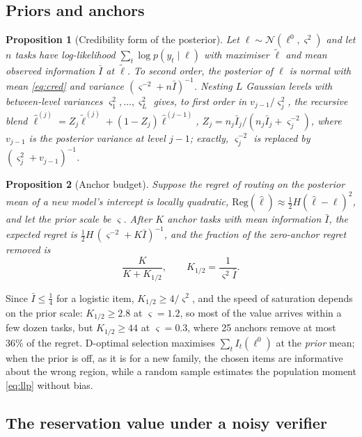 \documentclass[11pt,a4paper]{article}
\newtheorem{proposition}{Proposition}
\theoremstyle{definition}
\theoremstyle{remark}
\theoremstyle{definition}
\begin{document}
\subsection{Priors and anchors}

\begin{proposition}[Credibility form of the posterior]
\label{prop:cred}
Let $\ell\sim\mathcal N(\ell^0,\varsigma^2)$ and let $n$ tasks have log-likelihood $\sum_t\log p(y_t\mid\ell)$ with maximiser $\tilde\ell$ and mean observed information $\bar I$ at $\tilde\ell$. To second order, the posterior of $\ell$ is normal with mean \eqref{eq:cred} and variance $(\varsigma^{-2}+n\bar I)^{-1}$. Nesting $L$ Gaussian levels with between-level variances $\varsigma_1^2,\dots,\varsigma_L^2$ gives, to first order in $v_{j-1}/\varsigma_j^2$, the recursive blend $\hat\ell^{(j)}=Z_j\tilde\ell^{(j)}+(1-Z_j)\hat\ell^{(j-1)}$, $Z_j=n_j\bar I_j/(n_j\bar I_j+\varsigma_j^{-2})$, where $v_{j-1}$ is the posterior variance at level $j-1$; exactly, $\varsigma_j^{-2}$ is replaced by $(\varsigma_j^2+v_{j-1})^{-1}$.
\end{proposition}

\begin{proposition}[Anchor budget]
\label{prop:anchor}
Suppose the regret of routing on the posterior mean of a new model's intercept is locally quadratic, $\mathrm{Reg}(\hat\ell)\approx\tfrac12 H(\hat\ell-\ell)^2$, and let the prior scale be $\varsigma$. After $K$ anchor tasks with mean information $\bar I$, the expected regret is $\tfrac12 H\,(\varsigma^{-2}+K\bar I)^{-1}$, and the fraction of the zero-anchor regret removed is
\[
\frac{K}{K+K_{1/2}},\qquad K_{1/2}=\frac{1}{\varsigma^2\bar I}.
\]
\end{proposition}
Since $\bar I\le\tfrac14$ for a logistic item, $K_{1/2}\ge4/\varsigma^2$, and the speed of saturation depends on the prior scale: $K_{1/2}\ge2.8$ at $\varsigma=1.2$, so most of the value arrives within a few dozen tasks, but $K_{1/2}\ge44$ at $\varsigma=0.3$, where 25 anchors remove at most 36\% of the regret. D-optimal selection maximises $\sum_t I_t(\ell^0)$ at the \emph{prior} mean; when the prior is off, as it is for a new family, the chosen items are informative about the wrong region, while a random sample estimates the population moment \eqref{eq:llp} without bias.

\subsection{The reservation value under a noisy verifier}
\end{document}
